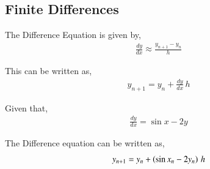 \documentclass[journal]{IEEEtran}
\begin{document}
    \subsection{Finite Differences}
       The Difference Equation is given by,
       \begin{align}
        \frac{dy}{dx} \approx \frac{y_{n+1} - y_n}{h}
       \end{align}

       This can be written as,
       \begin{align}
            y_{n+1} = y_n + \frac{dy}{dx} \, h
       \end{align}

       Given that,
       \begin{align}
        \frac{dy}{dx} = \sin{x} - 2y
       \end{align}

       The Difference equation can be written as,
       \begin{align}
        y_{n+1} = y_n + \left(\sin{x_n} - 2y_n\right)\, h
       \end{align}

\end{document}
